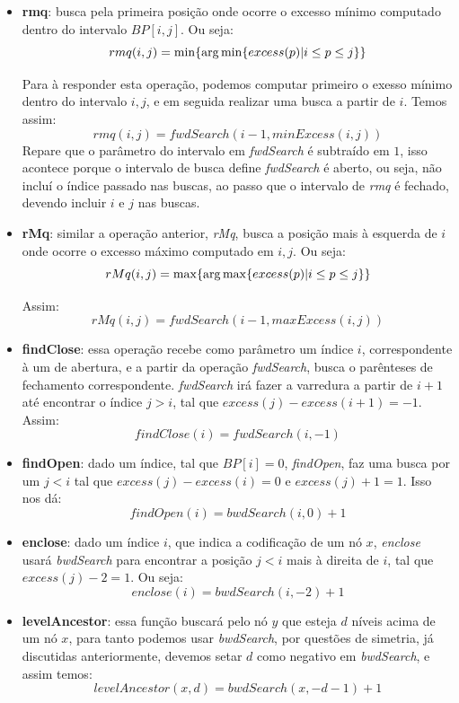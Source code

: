     \begin{itemize}
        \item \textbf{rmq}: busca pela primeira posição onde ocorre o excesso mínimo computado dentro do intervalo  $BP[i,j]$. Ou seja:
            $$rmq(i,j) =\min \{ \operatorname*{arg\,min}\{excess(p) | i \leq p \leq j\}\} $$
    
        Para à responder esta operação, podemos computar primeiro o exesso mínimo dentro do intervalo $i,j$, e em seguida realizar uma busca a partir de $i$.
        Temos assim:
        $$rmq(i,j) = fwdSearch(i-1,minExcess(i,j))$$
        Repare que o parâmetro do intervalo em \textit{fwdSearch} é subtraído em $1$, isso acontece porque o intervalo de busca define
        \textit{fwdSearch} é aberto, ou seja, não incluí o índice passado nas buscas, ao passo que o intervalo de \textit{rmq} é fechado, devendo incluir $i$ e 
        $j$ nas buscas. 
    
        \item \textbf{rMq}: similar a operação anterior, \textit{rMq}, busca a posição mais à esquerda de $i$ onde ocorre o excesso máximo computado em $i,j$. Ou seja:
        $$rMq(i,j) =\max\{ \operatorname*{arg\,max}\{excess(p) | i \leq p \leq j\}\} $$   
        
        Assim:
            $$rMq(i,j) = fwdSearch(i-1, maxExcess(i,j))$$


        \item \textbf{findClose}: essa operação recebe como parâmetro um índice $i$, correspondente à um de abertura, e a partir da operação \textit{fwdSearch},
        busca o parênteses de fechamento correspondente. \textit{fwdSearch} irá fazer a varredura a partir de $i+1$ até encontrar o índice $j > i $, tal que 
        $excess(j) - excess(i+1) = -1 $.  Assim:
        $$findClose(i) = fwdSearch(i,-1)$$
            
        \item \textbf{findOpen}:  dado um índice, tal que $BP[i]=0$, \textit{findOpen}, faz uma busca por um $j < i $ tal que $excess(j) - excess(i) = 0$ e $excess(j)+1=1$. 
        Isso nos dá:
        $$findOpen(i) = bwdSearch(i,0)+1$$
        
        \item \textbf{enclose}: dado um índice $i$, que indica a codificação de um nó $x$, \textit{enclose} usará \textit{bwdSearch} para encontrar a posição $j<i$ mais à direita de $i$, 
        tal que $excess(j) - 2 = 1$. Ou seja:
        $$enclose(i) = bwdSearch(i,-2) + 1$$

        \item  \textbf{levelAncestor}: essa função buscará pelo nó $y$ que esteja $d$ níveis acima de um nó $x$, para tanto podemos usar \textit{bwdSearch},
        por questões de simetria, já discutidas anteriormente, devemos setar $d$ como negativo em \textit{bwdSearch}, e assim temos:
        $$levelAncestor(x,d) = bwdSearch(x,-d-1)+1$$
        

\end{itemize}
